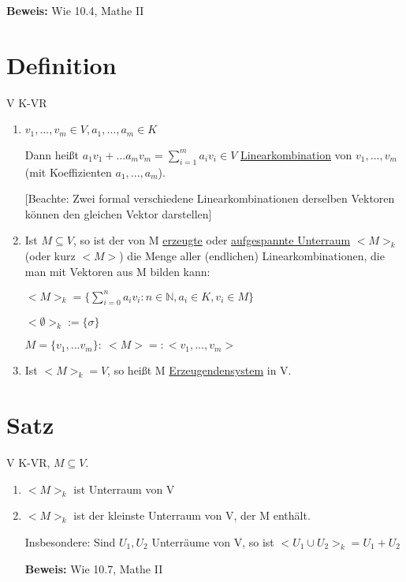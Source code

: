 \documentclass[a4paper, openany]{book}
\begin{document}
    \textbf{Beweis:} Wie 10.4, Mathe II

    \section{Definition}

    V K-VR

    \begin{enumerate}[label=(\alph*)]
      \item $v_1,...,v_m \in V, a_1,...,a_m \in K$

      Dann heißt $a_1v_1 + ...a_mv_m = \sum_{i=1}^{m} a_iv_i \in V$ \underline{Linearkombination} von $v_1,...,v_m$ (mit Koeffizienten $a_1,...,a_m$).

      [Beachte: Zwei formal verschiedene Linearkombinationen derselben Vektoren können den gleichen Vektor darstellen]

      \item Ist $M \subseteq V$, so ist der von M \underline{erzeugte} oder \underline{aufgespannte Unterraum} $<M>_k$ (oder kurz $<M>$) die Menge aller (endlichen) Linearkombinationen, die man mit Vektoren aus M bilden kann:

      $<M>_k = \{\sum_{i=0}^{n} a_iv_i : n \in \mathbb{N}, a_i \in K, v_i \in M\}$

      $< \emptyset >_k := \{ \sigma\}$

      $M =  \{v_1,...v_m\}: \ <M> =: <v_1,...,v_m>$

      \item Ist $<M>_k = V$, so heißt M \underline{Erzeugendensystem} in V.
    \end{enumerate}

    \section{Satz}

    V K-VR, $M \subseteq V$.

    \begin{enumerate}[label=(\alph*)]
      \item $<M>_k$ ist Unterraum von V
      \item $<M>_k$ ist der kleinste Unterraum von V, der M enthält.

      Insbesondere: Sind $U_1, U_2$ Unterräume von V, so ist  $<U_1 \cup U_2>_k = U_1 + U_2$

      \textbf{Beweis:} Wie 10.7, Mathe II
    \end{enumerate}
\end{document}
